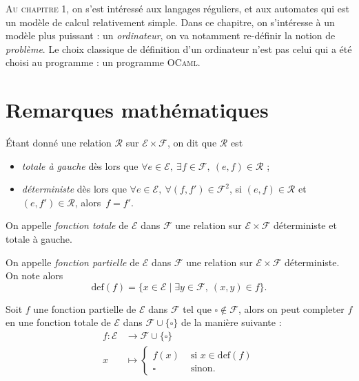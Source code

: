 \lettrine{A}{u chapitre 1}, on s'est intéressé aux langages réguliers, et aux automates qui est un modèle de calcul relativement simple. Dans ce chapitre, on s'intéresse à un modèle plus puissant : un \textit{ordinateur}, on va notamment re-définir la notion de \textit{problème}. Le choix classique de définition d'un ordinateur n'est pas celui qui a été choisi au programme : un programme \textsc{OCaml}.

\section{Remarques mathématiques}

\begin{defn}
	Étant donné une relation $\mathcal{R}$\/ sur $\mathcal{E} \times \mathcal{F}$, on dit que $\mathcal{R}$\/ est
	\begin{itemize}
		\item \textit{totale à gauche} dès lors que $\forall e \in \mathcal{E},\:\exists f \in \mathcal{F},\:(e,f) \in \mathcal{R}$\/ ;
		\item \textit{déterministe} dès lors que $\forall e \in \mathcal{E},\:\forall (f, f') \in \mathcal{F}^2$, si $(e,f) \in \mathcal{R}$\/ et $(e, f') \in \mathcal{R}$, alors~$f = f'$.
	\end{itemize}
\end{defn}

\begin{defn}
	On appelle \textit{fonction totale} de $\mathcal{E}$\/ dans $\mathcal{F}$\/ une relation sur $\mathcal{E} \times \mathcal{F}$\/ déterministe et totale à gauche.
\end{defn}

\begin{defn}
	On appelle \textit{fonction partielle} de $\mathcal{E}$\/ dans $\mathcal{F}$\/ une relation sur $\mathcal{E} \times \mathcal{F}$\/ déterministe. On note alors \[
		\mathrm{def}(f) = \{x \in \mathcal{E}  \mid \exists y \in \mathcal{F},\:(x,y) \in f\}
	.\]
\end{defn}

\begin{rmk}
	Soit $f$\/ une fonction partielle de $\mathcal{E}$\/ dans $\mathcal{F}$\/ tel que $\square \not\in \mathcal{F}$, alors on peut completer $f$\/ en une fonction totale de $\mathcal{E}$\/ dans $\mathcal{F} \cup \{\square\}$\/ de la manière suivante : \begin{align*}
		f : \mathcal{E}  &\longrightarrow \mathcal{F} \cup \{\square\} \\
		x &\longmapsto  \begin{cases}
			f(x) &\text{ si } x \in \mathrm{def}(f)\\
			\square &\text{ sinon}.
		\end{cases}
	\end{align*}
\end{rmk}

